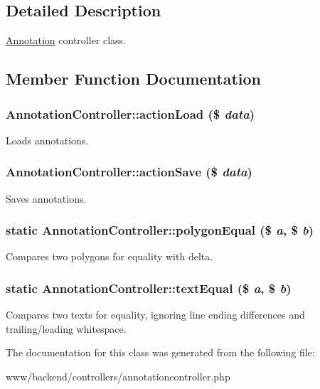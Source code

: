\subsection{Detailed Description}
\hyperlink{classAnnotation}{Annotation} controller class. 

\subsection{Member Function Documentation}
\hypertarget{classAnnotationController_a228bd6bdd25685e7f87732eb18acb746}{
\subsubsection[{actionLoad}]{\setlength{\rightskip}{0pt plus 5cm}AnnotationController::actionLoad (\$ {\em data})}}
\label{classAnnotationController_a228bd6bdd25685e7f87732eb18acb746}
Loads annotations. \hypertarget{classAnnotationController_a94966419fbc178f74f0e6570c62af1a2}{
\subsubsection[{actionSave}]{\setlength{\rightskip}{0pt plus 5cm}AnnotationController::actionSave (\$ {\em data})}}
\label{classAnnotationController_a94966419fbc178f74f0e6570c62af1a2}
Saves annotations. \hypertarget{classAnnotationController_aa01689fab994eafd254c12e1d3b7d168}{
\subsubsection[{polygonEqual}]{\setlength{\rightskip}{0pt plus 5cm}static AnnotationController::polygonEqual (\$ {\em a}, \/  \$ {\em b})}}
\label{classAnnotationController_aa01689fab994eafd254c12e1d3b7d168}
Compares two polygons for equality with delta. \hypertarget{classAnnotationController_a86c36225b9d315793d11c95d21664b31}{
\subsubsection[{textEqual}]{\setlength{\rightskip}{0pt plus 5cm}static AnnotationController::textEqual (\$ {\em a}, \/  \$ {\em b})}}
\label{classAnnotationController_a86c36225b9d315793d11c95d21664b31}
Compares two texts for equality, ignoring line ending differences and trailing/leading whitespace. 

The documentation for this class was generated from the following file:\begin{DoxyCompactItemize}
\item 
www/backend/controllers/annotationcontroller.php\end{DoxyCompactItemize}
